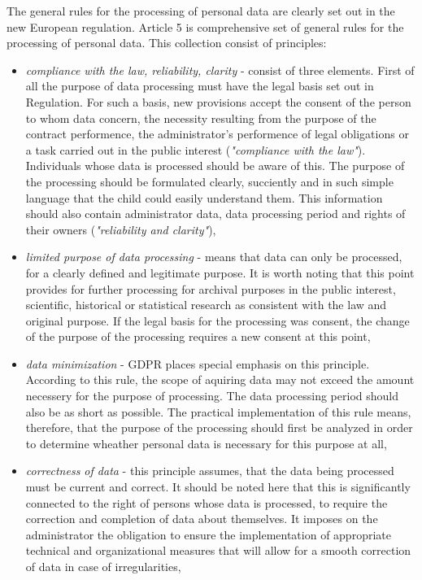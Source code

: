 \documentclass[en, noamssymb]{mgr}
\begin{document}
The general rules for the processing of personal data are clearly set out in the new European regulation. Article 5 is comprehensive set of general rules for the processing of personal data. This collection consist of principles:
\begin{itemize}

\item \textit{compliance with the law, reliability, clarity} - consist of three elements. First of all the purpose of data processing must have the legal basis set out in Regulation. For such a basis, new provisions accept the consent of the person to whom data concern, the necessity resulting from the purpose of the contract performence, the administrator's performence of legal obligations or a task carried out in the public interest (\textit{"compliance with the law"}). Individuals whose data is processed should be aware of this. The purpose of the processing should be formulated clearly, succiently and in such simple language that the child could easily understand them. This information should also contain administrator data, data processing period and rights of their owners (\textit{"reliability and clarity"}),

\item \textit{limited purpose of data processing} - means that data can only be processed, for a clearly defined and legitimate purpose. It is worth noting that this point provides for further processing for archival purposes in the public interest, scientific, historical or statistical research as consistent with the law and original purpose. If the legal basis for the processing was consent, the change of the purpose of the processing requires a new consent at this point,

\item \textit{data minimization} - GDPR places special emphasis on this principle. According to this rule, the scope of aquiring data may not exceed the amount necessery for the purpose of processing. The data processing period should also be as short as possible. The practical implementation of this rule means, therefore, that the purpose of the processing should first be analyzed in order to determine wheather personal data is necessary for this purpose at all,

\item \textit{correctness of data} - this principle assumes, that the data being processed must be current and correct. It should be noted here that this is significantly connected to the right of persons whose data is processed, to require the correction and completion of data about themselves. It imposes on the administrator the obligation to ensure the implementation of appropriate technical and organizational measures that will allow for a smooth correction of data in case of irregularities,


\end{itemize}
\end{document}
